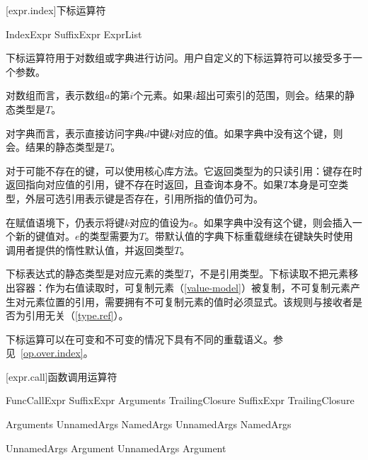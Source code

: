[expr.index]{下标运算符}

\begin{bnf}{IndexExpr}
    SuffixExpr \terminal{[} ExprList\bnfq \terminal{]}
\end{bnf}

\pnum
下标运算符用于对数组或字典进行访问。用户自定义的下标运算符可以接受多于一个参数。

\pnum
对数组而言，表示数组$a$的第$i$个元素。如果$i$超出可索引的范围，则会。结果的静态类型是$T$。

\pnum
对字典而言，表示直接访问字典$d$中键$k$对应的值。如果字典中没有这个键，则会。结果的静态类型是$T$。

\pnum
对于可能不存在的键，可以使用核心库方法。它返回类型为的只读引用：键存在时返回指向对应值的引用，键不存在时返回，且查询本身不。如果$T$本身是可空类型，外层可选引用表示键是否存在，引用所指的值仍可为。

\pnum
在赋值语境下，仍表示将键$k$对应的值设为$e$。如果字典中没有这个键，则会插入一个新的键值对。$e$的类型需要为$T$。带默认值的字典下标重载继续在键缺失时使用调用者提供的惰性默认值，并返回类型$T$。

\pnum
下标表达式的静态类型是对应元素的类型$T$，不是引用类型。下标读取不把元素移出容器：作为右值读取时，可复制元素（\ref{value-model}）被复制，不可复制元素产生对元素位置的引用，需要拥有不可复制元素的值时必须显式。该规则与接收者是否为引用无关（\ref{type.ref}）。

\pnum
下标运算可以在可变和不可变的情况下具有不同的重载语义。参见~\ref{op.over.index}。

[expr.call]{函数调用运算符}

\begin{bnf}{FuncCallExpr}
    SuffixExpr \terminal{(} Arguments\bnfq \terminal{)} TrailingClosure\bnfq \br
    SuffixExpr TrailingClosure
\end{bnf}

\begin{bnf}{Arguments}
    UnnamedArgs \br
    NamedArgs \br
    UnnamedArgs \terminal{,} NamedArgs
\end{bnf}

\begin{bnf}{UnnamedArgs}
    Argument \br
    UnnamedArgs \terminal{,} Argument
\end{bnf}

